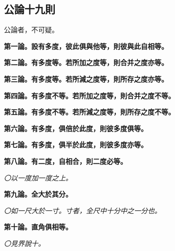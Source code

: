 \documentclass[12pt,b5paper,landscape]{article}
\def\mincho{\CJKfamily{vert}}
\newcommand{\ccom}[1]{{\footnotesize \emph{〇#1}}}
\newcommand{\cthm}[1]{{
\vspace{8pt}

\bfseries #1}}
\begin{document}
\begin{multicols}{2}
\subsection*{\mincho 公論十九則}

公論者，不可疑。

\cthm{第一論。設有多度，彼此俱與他等，則彼與此自相等。}

\cthm{第二論。有多度等。若所加之度等，則合并之度亦等。}

\cthm{第三論。有多度等。若所減之度等，則所存之度亦等。}

\cthm{第四論。有多度不等。若所加之度等，則合并之度不等。}

\cthm{第五論。有多度不等。若所減之度等，則所存之度不等。}

\cthm{第六論。有多度，俱倍於此度，則彼多度俱等。}

\cthm{第七論。有多度，俱半於此度，則彼多度亦等。}

\cthm{第八論。有二度，自相合，則二度必等。}\ccom{以一度加一度之上。}

\cthm{第九論。全大於其分。}\ccom{如一尺大於一寸。寸者，全尺中十分中之一分也。}

\cthm{第十論。直角俱相等。}\ccom{見界說十。}


\end{multicols}
\end{document}
